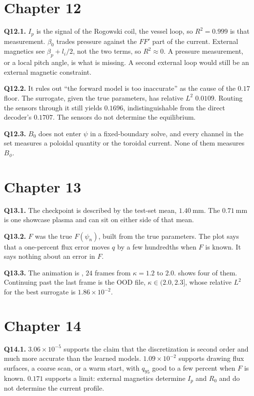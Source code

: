 \documentclass[11pt,a4paper,oneside,openany]{book}
\newcommand{\code}{\path}
\numberwithin{equation}{chapter}
\newcommand{\psin}{\psi_{n}}
\newcommand{\Ip}{I_{p}}
\theoremstyle{definition}
\begin{document}
\section*{Chapter 12}

\textbf{Q12.1.} \(\Ip\) is the signal of the Rogowski coil, the vessel loop, so \(R^{2}=0.999\) is that measurement. \(\beta_{0}\) trades pressure against the \(FF'\) part of the current. External magnetics see \(\beta_{p}+l_{i}/2\), not the two terms, so \(R^{2}\approx 0\). A pressure measurement, or a local pitch angle, is what is missing. A second external loop would still be an external magnetic constraint.

\textbf{Q12.2.} It rules out ``the forward model is too inaccurate'' as the cause of the \(0.17\) floor. The surrogate, given the true parameters, has relative \(L^{2}\) \(0.0109\). Routing the sensors through it still yields \(0.1696\), indistinguishable from the direct decoder's \(0.1707\). The sensors do not determine the equilibrium.

\textbf{Q12.3.} \(B_{0}\) does not enter \(\psi\) in a fixed-boundary solve, and every channel in the set measures a poloidal quantity or the toroidal current. None of them measures \(B_{\phi}\).

\section*{Chapter 13}

\textbf{Q13.1.} The checkpoint is described by the test-set mean, \(\qty{1.40}{\milli\metre}\). The \(\qty{0.71}{\milli\metre}\) is one showcase plasma and can sit on either side of that mean.

\textbf{Q13.2.} \(F\) was the true \(F(\psin)\), built from the true parameters. The plot says that a one-percent flux error moves \(q\) by a few hundredths when \(F\) is known. It says nothing about an error in \(F\).

\textbf{Q13.3.} The animation is \code{docs/figures/kappa_sweep.gif}, \(24\) frames from \(\kappa=1.2\) to \(2.0\).  shows four of them. Continuing past the last frame is the OOD file, \(\kappa\in(2.0,2.3]\), whose relative \(L^{2}\) for the best surrogate is \(1.86\times 10^{-2}\).

\section*{Chapter 14}

\textbf{Q14.1.} \(3.06\times 10^{-5}\) supports the claim that the discretization is second order and much more accurate than the learned models. \(1.09\times 10^{-2}\) supports drawing flux surfaces, a coarse scan, or a warm start, with \(q_{95}\) good to a few percent when \(F\) is known. \(0.171\) supports a limit: external magnetics determine \(\Ip\) and \(R_{0}\) and do not determine the current profile.
\end{document}
